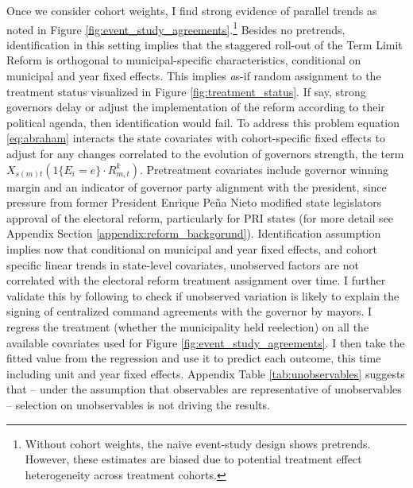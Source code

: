 \documentclass[12pt]{amsart}
\makeatletter
\def\subsection{\@startsection{subsection}{2}
	\z@{.8\linespacing\@plus.7\linespacing}{.7\linespacing}{\large}}
\numberwithin{equation}{section}
\theoremstyle{definition}
\theoremstyle{definition}
\theoremstyle{definition}
\makeatother
\begin{document}
\subsection{Identification \label{sec:identification}}
 
Once we consider cohort weights, I find strong evidence of parallel trends as noted in Figure \ref{fig:event_study_agreements}.\footnote{Without cohort weights, the naive event-study design shows pretrends. However, these estimates are biased due to potential treatment effect heterogeneity across treatment cohorts.} Besides no pretrends, identification in this setting implies that the staggered roll-out of the Term Limit Reform is orthogonal to municipal-specific characteristics, conditional on municipal and year fixed effects. This implies {\emph as-if} random assignment to the treatment status visualized in Figure \ref{fig:treatment_status}. If say, strong governors delay or adjust the implementation of the reform according to their political agenda, then identification would fail. To address this problem equation \ref{eq:abraham} interacts the state covariates with cohort-specific fixed effects to adjust for any changes correlated to the evolution of governors strength, the term $X_{s(m)t} (1\{E_i=e\} \cdot R^k_{m,t})$. Pretreatment covariates include governor winning margin and an indicator of governor party alignment with the president, since pressure from former President Enrique Peña Nieto modified state legislators approval of the electoral reform, particularly for PRI states (for more detail see Appendix Section \ref{appendix:reform_backgorund}). Identification assumption implies now that conditional on municipal and year fixed effects, and cohort specific linear trends in state-level covariates, unobserved factors are not correlated with the electoral reform treatment assignment over time. I further validate this by following \citet{altonji_etal_2005} to check if unobserved variation is likely to explain the signing of centralized command agreements with the governor by mayors. I regress the treatment (whether the municipality held reelection) on all the available covariates used for Figure \ref{fig:event_study_agreements}. I then take the fitted value from the regression and use it to predict each outcome, this time including unit and year fixed effects. Appendix Table \ref{tab:unobservables} suggests that – under the assumption that observables are representative of unobservables – selection on unobservables is not driving the results. 
\end{document}
